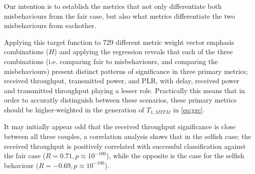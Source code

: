 \documentclass[conference]{IEEEtran}
\begin{document}
Our intention is to establish the metrics that not only differentiate both misbehaviours from the fair case, but also what metrics differentiate the two misbehaviours from eachother.

Applying this target function to 729 different metric weight vector emphasis combinations ($H$) and applying the regression reveals that each of the three combinations (i.e. comparing fair to misbehaviours, and comparing the misbehaviours) present distinct patterns of significance in three primary metrics; received throughput, transmitted power, and PLR, with delay, received power and transmitted throughput playing a lesser role.
Practically this means that in order to accuratly distinguish between these scenarios, these primary metrics should be higher-weighted in the generation of $T_{1,MTFM}$ in \eqref{eq:grc}.

It may initially appear odd that the received throughput significance is close between all three couples, a correlation analysis shows that in the selfish case; the received throughput is positively correlated with successful classification against the fair case ($R=0.71, p\approx10^{-100}$), while the opposite is the case for the selfish behaviour ($R=-0.69, p\approx10^{-100}$).
\end{document}
